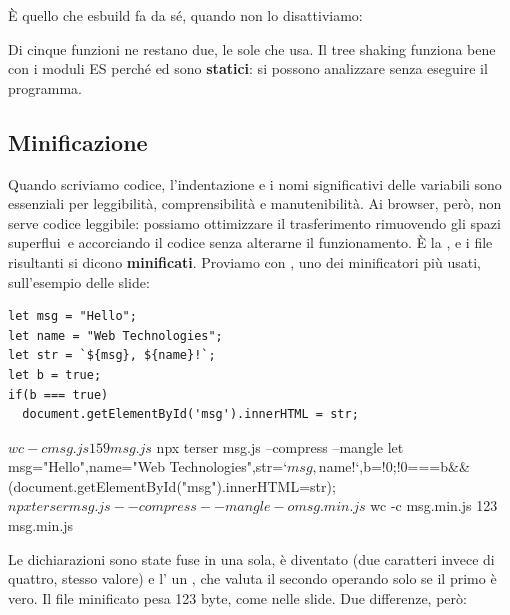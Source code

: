 È quello che esbuild fa da sé, quando non lo disattiviamo:


Di cinque funzioni ne restano due, le sole che  usa. Il tree
shaking funziona bene con i moduli ES perché  ed  sono
\textbf{statici}: si possono analizzare senza eseguire il programma.

\subsection{Minificazione}

Quando scriviamo codice, l'indentazione e i nomi significativi delle variabili
sono essenziali per leggibilità, comprensibilità e manutenibilità. Ai browser,
però, non serve codice leggibile: possiamo ottimizzare il trasferimento
rimuovendo gli spazi \guillemotleft superflui\guillemotright\ e accorciando il
codice senza alterarne il funzionamento. È la , e i file
risultanti si dicono \textbf{minificati}. Proviamo con , uno dei
minificatori più usati, sull'esempio delle slide:

\begin{lstlisting}[style=js, name=msg.js]
let msg = "Hello";
let name = "Web Technologies";
let str = `${msg}, ${name}!`;
let b = true;
if(b === true)
  document.getElementById('msg').innerHTML = str;
\end{lstlisting}

\begin{console}[Terminale]
$ wc -c msg.js
159 msg.js
$ npx terser msg.js --compress --mangle
let msg="Hello",name="Web Technologies",str=`${msg}, ${name}!`,b=!0;!0===b&&(document.getElementById("msg").innerHTML=str);
$ npx terser msg.js --compress --mangle -o msg.min.js
$ wc -c msg.min.js
123 msg.min.js
\end{console}

Le dichiarazioni sono state fuse in una sola,  è diventato
 (due caratteri invece di quattro, stesso valore) e l' un
\code{\&\&}, che valuta il secondo operando solo se il primo è vero. Il file
minificato pesa 123 byte, come nelle slide. Due differenze, però:


